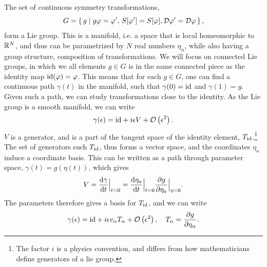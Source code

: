 The set of continuous symmetry transformations, 
\begin{equation}
    G = \left\{\, g \mid g \varphi = \varphi', \, S[\varphi'] = S[\varphi], \mathcal{D} \varphi' = \mathcal{D} \varphi  \,\right\},
\end{equation}
form a Lie group.
This is a manifold, i.e. a space that is local homeomorphic to $\mathbb{R}^N$, and thus can be parametrized by $N$ real numbers $\eta_\alpha$, while also having a group structure, composition of transformations.
We will focus on connected Lie groups, in which we all elements $g \in G$ is in the same connected piece as the identity map $\mathrm{id}(\varphi) = \varphi$.
This means that for each $g\in G$, one can find a continuous path $\gamma(t)$ in the manifold, such that $\gamma(0) = \mathrm{id}$ and $\gamma(1) = g$.
Given such a path, we can study transformations close to the identity.
As the Lie group is a smooth manifold, we can write
\begin{equation}
    \gamma(\epsilon) = \mathrm{id} + i \epsilon V + \mathcal{O}\left(\epsilon^{2}\right).
\end{equation}
$V$ is a generator, and is a part of the tangent space of the identity element, $T_{\mathrm{id}}$.\footnote{The factor $i$ is a physics convention, and differs from how mathematicians define generators of a lie group.}
The set of generators such $T_{\mathrm{id}}$, thus forms a vector space, and the coordinates $\eta_a$ induce a coordinate basis.
This can be written as a path through parameter space, $\gamma(t) = g(\eta(t))$, which gives
\begin{equation}
    V = \diff{\gamma}{t}\Big|_{t=0} = \diff{\eta_a}{t}\Big|_{t=0} \diffp{g}{\eta_a}\Big|_{\eta=0}.
\end{equation}
The parameters therefore gives a basis for $T_{\mathrm{id}}$, and we can write
\begin{equation}
    \gamma(\epsilon) = \id + i \epsilon v_\alpha T_\alpha + \Oh{\epsilon}, 
    \quad 
    T_\alpha = \diffp{g}{\eta_\alpha}.
\end{equation}
